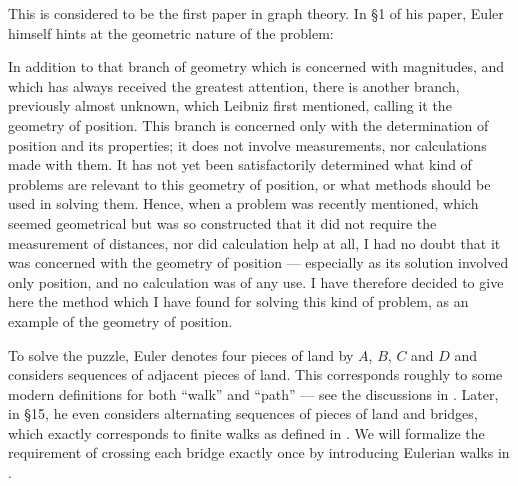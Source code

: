 \begin{example}
  This is considered to be the first paper in graph theory. In \S 1 of his paper, Euler himself hints at the geometric nature of the problem:
  \begin{displayquote}
    In addition to that branch of geometry which is concerned with magnitudes, and which has always received the greatest attention, there is another branch, previously almost unknown, which Leibniz first mentioned, calling it the geometry of position. This branch is concerned only with the determination of position and its properties; it does not involve measurements, nor calculations made with them. It has not yet been satisfactorily determined what kind of problems are relevant to this geometry of position, or what methods should be used in solving them. Hence, when a problem was recently mentioned, which seemed geometrical but was so constructed that it did not require the measurement of distances, nor did calculation help at all, I had no doubt that it was concerned with the geometry of position — especially as its solution involved only position, and no calculation was of any use. I have therefore decided to give here the method which I have found for solving this kind of problem, as an example of the geometry of position.
  \end{displayquote}

  To solve the puzzle, Euler denotes four pieces of land by \( A \), \( B \), \( C \) and \( D \) and considers sequences of adjacent pieces of land. This corresponds roughly to some modern definitions for both \enquote{walk} and \enquote{path} --- see the discussions in . Later, in \S 15, he even considers alternating sequences of pieces of land and bridges, which exactly corresponds to finite walks as defined in . We will formalize the requirement of crossing each bridge exactly once by introducing Eulerian walks in .


\end{example}
